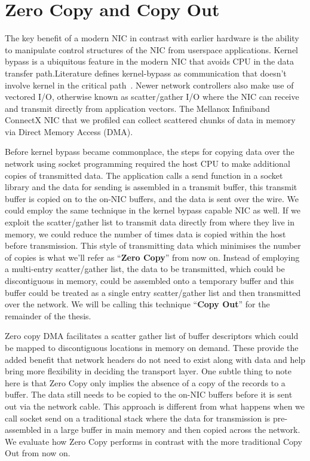 \section{Zero Copy and Copy Out}
The key benefit of a modern NIC in contrast with earlier hardware is the ability to manipulate control structures of the NIC from userspace applications. 
Kernel bypass is a ubiquitous feature in the modern NIC that avoids CPU in the data transfer path.\linebreak  Literature defines kernel-bypass as communication that doesn't 
involve kernel in the \linebreak critical path~\cite{unetkernelbypass}. Newer network controllers also make use of vectored I/O, otherwise known as scatter/gather I/O
where the NIC can receive and transmit directly from \linebreak application vectors. The Mellanox Infiniband ConnectX
NIC that we profiled can \linebreak collect scattered chunks of data in memory via Direct Memory Access (DMA).

Before kernel bypass became commonplace, the steps for copying data over the network using socket programming 
required the host CPU to make additional copies of transmitted data.
The application calls a send function in a socket library and the data for sending is assembled 
in a transmit buffer, this transmit buffer is copied on to the on-NIC buffers, and the data is 
sent over the wire. We could employ the same technique in the kernel bypass capable NIC as well.
If we exploit the scatter/gather list to transmit data directly from where they live in memory, 
we could reduce the number of times data is copied within the host before transmission. 
This style of transmitting data which minimises the number of copies is what we'll refer as \enquote{\textbf{Zero Copy}} from now on.
Instead of employing a multi-entry scatter/gather list, the data to be transmitted, which could be discontiguous in memory, could be assembled 
onto a temporary buffer and this buffer could be treated as a single entry scatter/gather list
and then transmitted over the network. We will be calling this technique \enquote{\textbf{Copy Out}} for the remainder of the thesis. 


Zero copy DMA facilitates a scatter gather list of buffer descriptors
which could be mapped to discontiguous locations in memory on demand. These provide
the added benefit that network headers do not need to exist along with data and help bring more flexibility 
in deciding the transport layer. One subtle thing to note here is that Zero Copy only implies the absence 
of a copy of the records to a buffer. The data still needs to be copied to the on-NIC buffers before 
it is sent out via the network cable. This approach is different from what happens when we call socket send on 
a traditional stack where the data for transmission is pre-assembled in a large buffer in main memory 
and then copied across the network. We evaluate how Zero Copy performs in contrast 
with the more traditional Copy Out from now on.

